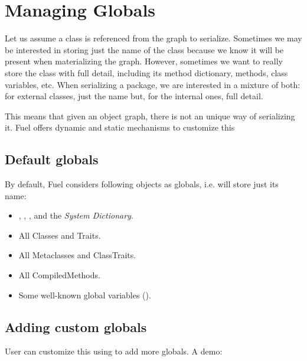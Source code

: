 \documentclass[a4paper,10pt,twoside]{book}
\begin{document}
\section{Managing Globals}

Let us assume a class is referenced from the graph to serialize. Sometimes we may be interested in storing just the name of the class because we know it will be present when materializing the graph. However, sometimes we want to really store the class with full detail, including its method dictionary, methods, class variables, etc. When serializing a package, we are interested in a mixture of both: for external classes, just the name but, for the internal ones, full detail.

This means that given an object graph, there is not an unique way of serializing it. Fuel offers dynamic and static mechanisms to customize this


\subsection{Default globals}

By default, Fuel considers following objects as globals, i.e. will store just its name:

\begin{itemize}

\item {}, , , and the \emph{System Dictionary}.

\item All Classes and Traits.

\item All Metaclasses and ClassTraits.

\item All CompiledMethods.

\item Some well-known global variables ().

\end{itemize}


\subsection{Adding custom globals}

User can customize this using  to add more globals. A demo:
\end{document}
